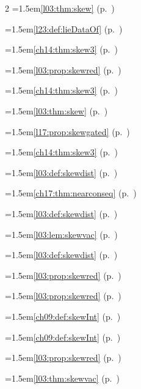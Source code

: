 \begin{multicols}{2}
\hangindent=1.5em\quad \ref{l03:thm:skew} (p.~\pageref{l03:thm:skew})\par
\hangindent=1.5em\quad \ref{l23:def:lieDataOf} (p.~\pageref{l23:def:lieDataOf})\par
\hangindent=1.5em\quad \ref{ch14:thm:skew3} (p.~\pageref{ch14:thm:skew3})\par
\hangindent=1.5em\quad \ref{l03:prop:skewred} (p.~\pageref{l03:prop:skewred})\par
\hangindent=1.5em\quad \ref{ch14:thm:skew3} (p.~\pageref{ch14:thm:skew3})\par
\hangindent=1.5em\quad \ref{l03:thm:skew} (p.~\pageref{l03:thm:skew})\par
\hangindent=1.5em\quad \ref{l17:prop:skewgated} (p.~\pageref{l17:prop:skewgated})\par
\hangindent=1.5em\quad \ref{ch14:thm:skew3} (p.~\pageref{ch14:thm:skew3})\par
\hangindent=1.5em\quad \ref{l03:def:skewdist} (p.~\pageref{l03:def:skewdist})\par
\hangindent=1.5em\quad \ref{ch17:thm:nearconseq} (p.~\pageref{ch17:thm:nearconseq})\par
\hangindent=1.5em\quad \ref{l03:def:skewdist} (p.~\pageref{l03:def:skewdist})\par
\hangindent=1.5em\quad \ref{l03:lem:skewvac} (p.~\pageref{l03:lem:skewvac})\par
\hangindent=1.5em\quad \ref{l03:def:skewdist} (p.~\pageref{l03:def:skewdist})\par
\hangindent=1.5em\quad \ref{l03:prop:skewred} (p.~\pageref{l03:prop:skewred})\par
\hangindent=1.5em\quad \ref{l03:prop:skewred} (p.~\pageref{l03:prop:skewred})\par
\hangindent=1.5em\quad \ref{ch09:def:skewInt} (p.~\pageref{ch09:def:skewInt})\par
\hangindent=1.5em\quad \ref{ch09:def:skewInt} (p.~\pageref{ch09:def:skewInt})\par
\hangindent=1.5em\quad \ref{l03:prop:skewred} (p.~\pageref{l03:prop:skewred})\par
\hangindent=1.5em\quad \ref{l03:thm:skewvac} (p.~\pageref{l03:thm:skewvac})\par

\end{multicols}
